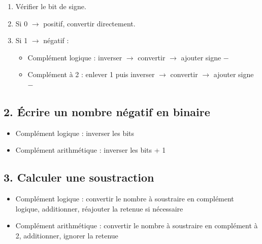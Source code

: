 \documentclass[a4paper,12pt]{article}
\begin{document}
\begin{enumerate} 

    \item Vérifier le bit de signe. 

    \item Si 0 $\rightarrow$ positif, convertir directement. 

    \item Si 1 $\rightarrow$ négatif : 

    \begin{itemize} 

        \item Complément logique : inverser $\rightarrow$ convertir $\rightarrow$ ajouter signe $-$ 

        \item Complément à 2 : enlever 1 puis inverser $\rightarrow$ convertir $\rightarrow$ ajouter signe $-$ 

    \end{itemize} 

\end{enumerate} 

  

\subsection*{2. Écrire un nombre négatif en binaire} 

\begin{itemize} 

    \item Complément logique : inverser les bits 

    \item Complément arithmétique : inverser les bits + 1 

\end{itemize} 

  

\subsection*{3. Calculer une soustraction} 

\begin{itemize} 

    \item Complément logique : convertir le nombre à soustraire en complément logique, additionner, réajouter la retenue si nécessaire 

    \item Complément arithmétique : convertir le nombre à soustraire en complément à 2, additionner, ignorer la retenue 

\end{itemize} 
\end{document}
